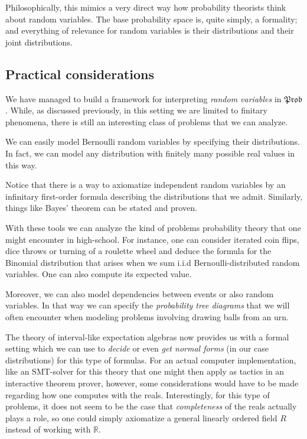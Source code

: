 \documentclass[a4paper]{amsproc}
\theoremstyle{plain}
\theoremstyle{definition}
\theoremstyle{remark}
\numberwithin{equation}{section}
\newcommand{\Prob}{\mathfrak{Prob}}
\begin{document}
Philosophically, this mimics a very direct way how probability theorists think about random variables. The base probability space is, quite simply, a formality; and everything of relevance for random variables is their distributions and their joint distributions.

\subsection{Practical considerations}

We have managed to build a framework for interpreting \emph{random variables} in $\Prob$. While, as discussed previously, in this setting we are limited to finitary phenomena, there is still an interesting class of problems that we can analyze.

We can easily model Bernoulli random variables by specifying their distributions. In fact, we can model any distribution with finitely many possible real values in this way.

Notice that there is a way to axiomatize independent random variables by an infinitary first-order formula describing the distributions that we admit. Similarly, things like Bayes' theorem can be stated and proven.

With these tools we can analyze the kind of problems probability theory that one might encounter in high-school. For instance, one can consider iterated coin flips, dice throws or turning of a roulette wheel and deduce the formula for the Binomial distribution that arises when we sum i.i.d Bernoulli-distributed random variables. One can also compute its expected value.

Moreover, we can also model dependencies between events or also random variables. In that way we can specify the \emph{probability tree diagrams} that we will often encounter when modeling problems involving drawing balls from an urn.

The theory of interval-like expectation algebras now provides us with a formal setting which we can use to \emph{decide} or even \emph{get normal forms} (in our case distributions) for this type of formulas. For an actual computer implementation, like an SMT-solver for this theory that one might then apply as tactics in an interactive theorem prover, however, some considerations would have to be made regarding how one computes with the reals. Interestingly, for this type of problems, it does not seem to be the case that \emph{completeness} of the reals actually plays a role, so one could simply axiomatize a general linearly ordered field $R$ instead of working with $\mathbb{R}$.



\end{document}
